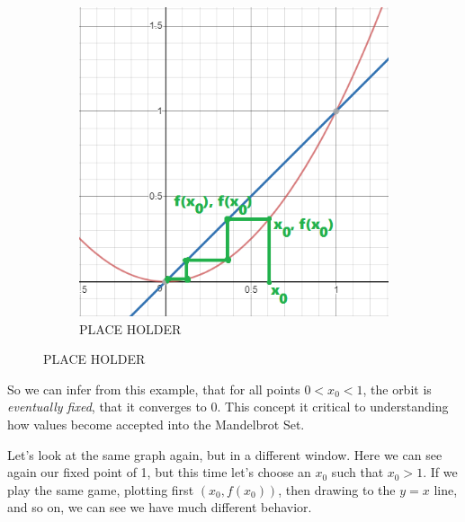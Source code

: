 \documentclass[20pt]{article} %
\begin{document}
\begin{figure}[!htbp]
  	\centering
   	\begin{subfigure}[p]{0.5\linewidth}
    	\includegraphics[width=\linewidth]{./figures/fp-4.png}
	\caption{PLACE HOLDER}
   	\end{subfigure}
\end{figure}

So we can infer from this example, that for all points $0 < x_0 < 1$, the orbit is \textit{eventually fixed}, that it converges to 0.  This concept it critical to understanding how values become accepted into the Mandelbrot Set. 

\newpage
Let's look at the same graph again, but in a different window.  Here we can see again our fixed point of 1, but this time let's choose an $x_0$ such that $x_0 > 1$. If we play the same game, plotting first $(x_0, f(x_0))$, then drawing to the $y=x$ line, and so on, we can see we have much different behavior.
\end{document}
